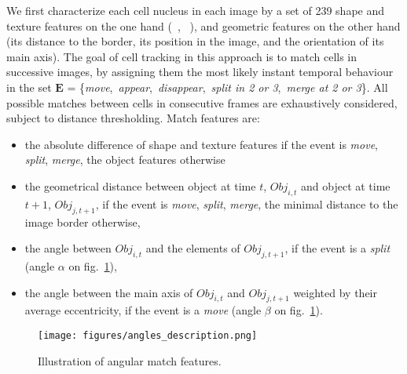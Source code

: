 We first characterize each cell nucleus in each image by a set of 239 shape and texture features on the one hand (~\cite{Walter2010}, ~\cite{cellcognition}), and geometric features on the other hand (its distance to the border, its position in the image, and the orientation of its main axis). The goal of cell tracking in this approach is to match cells in successive images, by assigning them the most likely instant temporal behaviour in the set $\mathbf{E}$ = \{\textit{move},~\textit{appear},~\textit{disappear},~\textit{split in 2 or 3},~\textit{merge at 2 or 3}\}. %
All possible matches between cells in consecutive frames are exhaustively considered, subject to
distance thresholding. Match features are: 
\begin{itemize}
\item the absolute difference of shape and texture features if the event is \textit{move}, \textit{split}, \textit{merge}, the object features otherwise
\item the geometrical distance between object at time $t$, $Obj_{i, t}$ and object at time $t+1$, $Obj_{j, t+1}$, if the event is \textit{move}, \textit{split}, \textit{merge}, the minimal distance to the image border otherwise,
\item the angle between $Obj_{i, t}$ and the elements of $Obj_{j, t+1}$, if the event is a \textit{split} (angle $\alpha$ on fig.~\ref{fig:angles}),
\item the angle between the main axis of $Obj_{i, t}$ and $Obj_{j, t+1}$ weighted by their average eccentricity, if the event is a \textit{move} (angle $\beta$ on fig.~\ref{fig:angles}).
\end{itemize}

\begin{figure}[ht]
\centerline{\texttt{[image: figures/angles\_description.png]}}
\caption{Illustration of angular match features.}
\label{fig:angles}
\end{figure}


